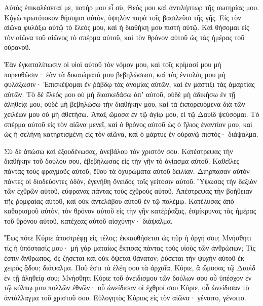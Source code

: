 {Αὐτὸς ἐπικαλέσεταί με, πατήρ μου εἶ σὺ, Θεός μου καὶ ἀντιλήπτωρ τῆς σωτηρίας μου.
Κᾀγὼ πρωτότοκον θήσομαι αὐτὸν, ὑψηλὸν παρὰ τοῖς βασιλεῦσι τῆς γῆς.
Εἰς τὸν αἰῶνα φυλάξω αὐτῷ τὸ ἔλεός μου, καὶ ἡ διαθήκη μου πιστὴ αὐτῷ.
Καὶ θήσομαι εἰς τὸν αἰῶνα τοῦ αἰῶνος τὸ σπέρμα αὐτοῦ, καὶ τὸν θρόνον αὐτοῦ ὡς τὰς ἡμέρας τοῦ οὐρανοῦ.
\par }{\PP {}Ἐὰν ἐγκαταλίπωσιν οἱ υἱοὶ αὐτοῦ τὸν νόμον μου, καὶ τοῖς κρίμασί μου μὴ πορευθῶσιν·
ἐὰν τὰ δικαιώματά μου βεβηλώσωσι, καὶ τὰς ἐντολάς μου μὴ φυλάξωσιν·
Ἐπισκέψομαι ἐν ῥάβδῳ τὰς ἀνομίας αὐτῶν, καὶ ἐν μάστιξι τὰς ἁμαρτίας αὐτῶν.
Τὸ δὲ ἔλεός μου οὐ μὴ διασκεδάσω ἀπʼ αὐτοῦ, οὐδὲ μὴ ἀδικήσω ἐν τῇ ἀληθείᾳ μου,
οὐδὲ μὴ βεβηλώσω τὴν διαθήκην μου, καὶ τὰ ἐκπορευόμενα διὰ τῶν χειλέων μου οὐ μὴ ἀθετήσω.
Ἅπαξ ὤμοσα ἐν τῷ ἁγίῳ μου, εἰ τῷ Δαυὶδ ψεύσομαι.
Τὸ σπέρμα αὐτοῦ εἰς τὸν αἰῶνα μενεῖ, καὶ ὁ θρόνος αὐτοῦ ὡς ὁ ἥλιος ἐναντίον μου,
καὶ ὡς ἡ σελήνη κατηρτισμένη εἰς τὸν αἰῶνα, καὶ ὁ μάρτυς ἐν οὐρανῷ πιστός· διάψαλμα.
\par }{\PP {}Σὺ δὲ ἀπώσω καὶ ἐξουδένωσας, ἀνεβάλου τὸν χριστόν σου.
Κατέστρεψας τὴν διαθήκην τοῦ δούλου σου, ἐβεβήλωσας εἰς τὴν γῆν τὸ ἁγίασμα αὐτοῦ.
Καθεῖλες πάντας τοὺς φραγμοῦς αὐτοῦ, ἔθου τὰ ὀχυρώματα αὐτοῦ δειλίαν.
Διήρπασαν αὐτὸν πάντες οἱ διοδεύοντες ὁδὸν, ἐγενήθη ὄνειδος τοῖς γείτοσιν αὐτοῦ.
Ὕψωσας τὴν δεξιὰν τῶν ἐχθρῶν αὐτοῦ, εὔφρανας πάντας τοὺς ἐχθροὺς αὐτοῦ.
Ἀπέστρεψας τὴν βοήθειαν τῆς ῥομφαίας αὐτοῦ, καὶ οὐκ ἀντελάβου αὐτοῦ ἐν τῷ πολέμῳ.
Κατέλυσας ἀπὸ καθαρισμοῦ αὐτὸν, τὸν θρόνον αὐτοῦ εἰς τὴν γῆν κατέῤῥαξας,
ἐσμίκρυνας τὰς ἡμέρας τοῦ θρόνου αὐτοῦ, κατέχεας αὐτοῦ αἰσχύνην· διάψαλμα.
\par }{\PP {}Ἕως πότε Κύριε ἀποστρέφῃ εἰς τέλος; ἐκκαυθήσεται ὡς πῦρ ἡ ὀργή σου;
Μνήσθητι τίς ἡ ὑπόστασίς μου· μὴ γὰρ ματαίως ἔκτισας πάντας τοὺς υἱοὺς τῶν ἀνθρώπων;
Τίς ἐστιν ἄνθρωπος, ὃς ζήσεται καὶ οὐκ ὄψεται θάνατον; ῥύσεται τὴν ψυχὴν αὐτοῦ ἐκ χειρὸς ᾅδου; διάψαλμα.
Ποῦ ἐστι τὰ ἐλέη σου τὰ ἀρχαῖα, Κύριε, ἃ ὤμοσας τῷ Δαυὶδ ἐν τῇ ἀληθείᾳ σου;
Μνήσθητι Κύριε τοῦ ὀνειδισμου τῶν δούλων σου οὗ ὑπέσχον ἐν τῷ κόλπῳ μου πολλῶν ἐθνῶν·
οὗ ὠνείδισαν οἱ ἐχθροί σου Κύριε, οὗ ὠνείδισαν τὸ ἀντάλλαγμα τοῦ χριστοῦ σου.
Εὐλογητὸς Κύριος εἰς τὸν αἰῶνα· γένοιτο, γένοιτο.

}
